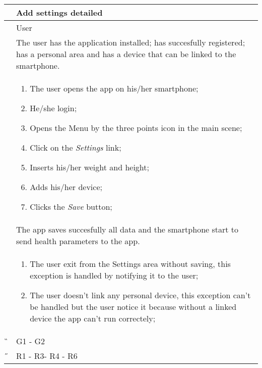 \begin{center}
	\begin{longtable}{ | p{} | p{} | }
		\hline
		 \A &   Add settings detailed\\ 

		\hline
		 \B &  User \\ 

		\hline
  		 \C &  The user has the application installed; has succesfully registered; has a personal 	area and has a device that can be linked to the smartphone.\\ 

		\hline
		\D & \begin{enumerate}
			\item The user opens the app on his/her smartphone;
			\item He/she login;
			\item Opens the Menu by the three points icon in the main scene;
			\item Click on the \textit{Settings} link;
			\item Inserts his/her weight and height;
			\item Adds his/her device;
			\item Clicks the \textit{Save} button;
		\end{enumerate} \\

		\hline
		\E & The app saves succesfully all data and the smartphone start to send health parameters to the app.\\

		\hline
		\F & \begin{enumerate}
			\item The user exit from the Settings area without saving, this exception is handled by notifying it to the user;
			\item The user doesn't link any personal device, this exception can't be handled but the user notice it because 					without a linked device the app can't run correctely;
		\end{enumerate} \\
		
		\hline
		\G & G1 - G2\\

		\hline
		\H & R1 - R3- R4 - R6 \\
		\hline

	\end{longtable}
\end{center}